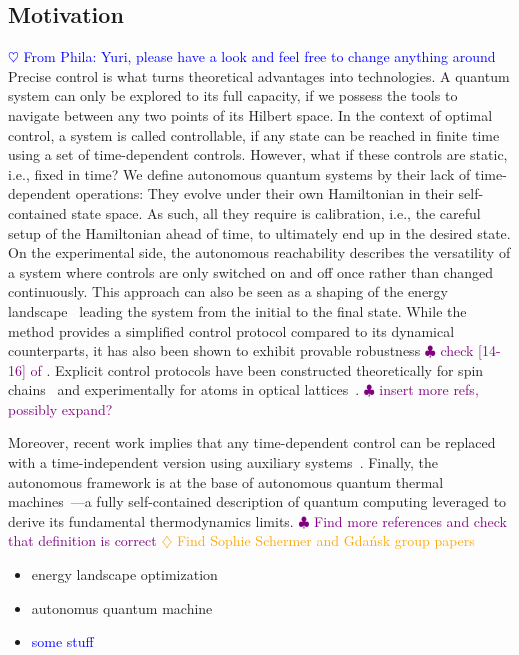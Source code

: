 \documentclass[aps,prx,reprint,superscriptaddress,footnote, twocolumn,notitlepage]{revtex4-2}
\newcommand{\yu}[1]{\textcolor{blue}{#1}}
\newcommand{\ko}[1]{\textcolor{orange}{#1}}
\newcommand{\ph}[1]{\textcolor{purple}{#1}}
\newcommand{\todoyu}[1]{\yu{$\heartsuit$ #1}}
\newcommand{\todoko}[1]{\ko{$\diamondsuit$ #1}}
\newcommand{\todoph}[1]{\ph{$\clubsuit$ #1}}
\begin{document}
\subsection{Motivation}
\todoyu{From Phila: Yuri, please have a look and feel free to change anything around}\\
Precise control is what turns theoretical advantages into technologies.
A quantum system can only be explored to its full capacity, if we possess the tools to navigate between any two points of its Hilbert space.
In the context of optimal control, a system is called controllable, if any state can be reached in finite time using a set of time-dependent controls.
However, what if these controls are static, i.e., fixed in time?
We define autonomous quantum systems by their lack of time-dependent operations: They evolve under their own Hamiltonian in their self-contained state space.
As such, all they require is calibration, i.e., the careful setup of the Hamiltonian ahead of time, to ultimately end up in the desired state.
On the experimental side, the autonomous reachability describes the versatility of a system where controls are only switched on and off once rather than changed continuously. 
This approach can also be seen as a shaping of the energy landscape~\cite{schirmer_design_2018} leading the system from the initial to the final state. 
While the method provides a simplified control protocol compared to its dynamical counterparts, it has also been shown to exhibit provable robustness \todoph{check  [14-16] of \cite{schirmer_design_2018}}.
Explicit control protocols have been constructed theoretically for spin chains~\cite{schirmer_design_2018} and experimentally for atoms in optical lattices~\cite{weidner_energy_2025}. \todoph{insert more refs, possibly expand?}

Moreover, recent work implies that any time-dependent control can be replaced with a time-independent version using auxiliary systems~\cite{mooney_time_2025}.
Finally, the autonomous framework is at the base of autonomous quantum thermal machines~\cite{meier_autonomous_2024}---a fully self-contained description of quantum computing leveraged to derive its fundamental thermodynamics limits.
\todoph{Find more references and check that definition is correct} \todoko{Find Sophie Schermer and Gdańsk group papers}

\begin{itemize}
    \item energy landscape optimization 
    \item autonomus quantum machine 
    \item \yu{some stuff}
\end{itemize}
\end{document}
